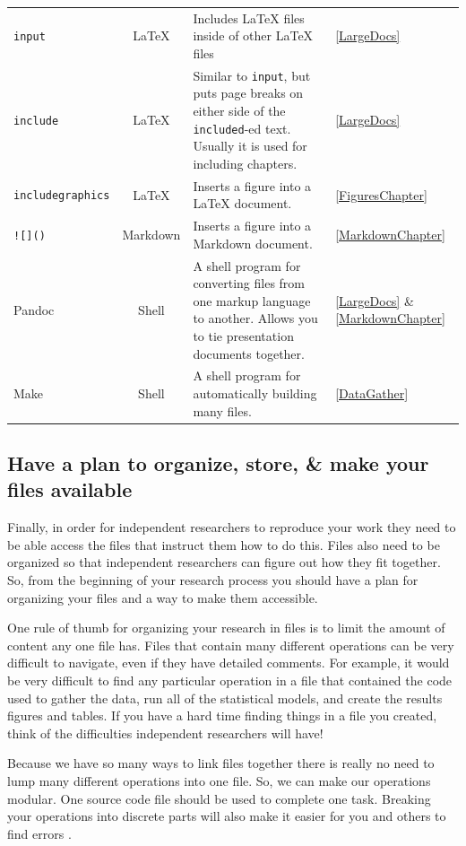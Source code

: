 \documentclass[krantz1]{krantz}
\begin{document}
\begin{table}
{{\begin{tabular}{p{2.5cm} c p{5.25cm} p{2cm}}
        {\tt{input}} & LaTeX & Includes LaTeX files inside of other LaTeX files & \hfill\ref{LargeDocs} \\[0.25cm]
        {\tt{include}} & LaTeX & Similar to {\tt{input}}, but puts page breaks on either side of the \texttt{included}-ed text. Usually it is used for including chapters. & \hfill\ref{LargeDocs} \\[0.25cm]
        {\tt{includegraphics}} & LaTeX & Inserts a figure into a LaTeX document. & \hfill\ref{FiguresChapter} \\[0.25cm]
        \texttt{![]()} & Markdown & Inserts a figure into a Markdown document. & \hfill\ref{MarkdownChapter} \\  [0.25cm]   
        Pandoc & Shell & A shell program for converting files from one markup language to another. Allows you to tie presentation documents together. & \hfill\ref{LargeDocs} \& \ref{MarkdownChapter} \\[0.25cm]   
        Make & Shell & A shell program for automatically building many files. & \ref{DataGather} \\[0.25cm]
        \hline 
    \end{tabular}
    }}
\end{table}

\subsection{Have a plan to organize, store, \& make your files available}

Finally, in order for independent researchers to reproduce your work they need to be able access the files that instruct them how to do this. Files also need to be organized so that independent researchers can figure out how they fit together. So, from the beginning of your research process you should have a plan for organizing your files and a way to make them accessible. 

One rule of thumb for organizing your research in files is to limit the amount of content any one file has. Files that contain many different operations can be very difficult to navigate, even if they have detailed comments. For example, it would be very difficult to find any particular operation in a file that contained the code used to gather the data, run all of the statistical models, and create the results figures and tables. If you have a hard time finding things in a file you created, think of the difficulties independent researchers will have! 

Because we have so many ways to link files together there is really no need to lump many different operations into one file. So, we can make our operations modular. One source code file should be used to complete one task. Breaking your operations into discrete parts will also make it easier for you and others to find errors \cite[490]{Nagler1995}.
\end{document}
